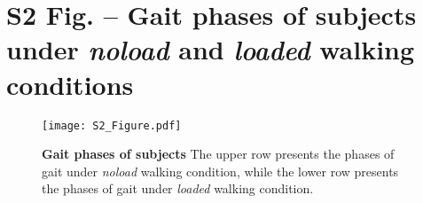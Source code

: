 \documentclass[10pt,letterpaper]{article}
\renewcommand{\figurename}{Fig}
\begin{document}
\newpage
\section*{S2 Fig. -- Gait phases of subjects under \textit{noload} and \textit{loaded} walking conditions} %
\renewcommand{\figurename}{S2 Fig}
\renewcommand{\thefigure}{\arabic{figure}}
\setcounter{figure}{0}
\bigskip
\bigskip
\bigskip
\bigskip
\bigskip
\nolinenumbers
\begin{figure*}[ht]
	\centering
	\texttt{[image: S2\_Figure.pdf]}
	\vspace{-3mm}
	\caption{{\small\textbf{Gait phases of subjects } The upper row presents the phases of gait under \textit{noload} walking condition, while the lower row presents the phases of gait under  \textit{loaded} walking condition.}}
	\label{Fig_S2}
\end{figure*}

\newpage
\end{document}

